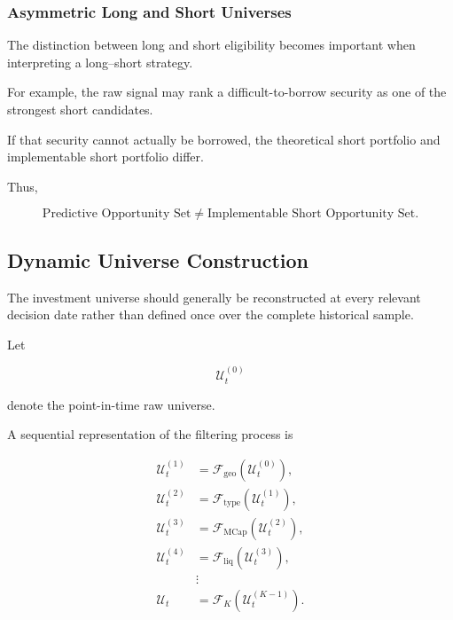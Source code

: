 \documentclass[11pt,a4paper]{article}
\begin{document}
\subsubsection{Asymmetric Long and Short Universes}

The distinction between long and short eligibility becomes important when
interpreting a long--short strategy.

For example, the raw signal may rank a difficult-to-borrow security as one of
the strongest short candidates.

If that security cannot actually be borrowed, the theoretical short portfolio
and implementable short portfolio differ.

Thus,

\begin{equation}
\boxed{
\text{Predictive Opportunity Set}
\neq
\text{Implementable Short Opportunity Set}.
}
\end{equation}


\subsection{Dynamic Universe Construction}
\label{subsec:dynamic_universe_construction}

The investment universe should generally be reconstructed at every relevant
decision date rather than defined once over the complete historical sample.

Let

\begin{equation}
\mathcal{U}_t^{(0)}
\end{equation}

denote the point-in-time raw universe.

A sequential representation of the filtering process is

\begin{equation}
\begin{aligned}
\mathcal{U}_t^{(1)}
&=
\mathcal{F}_{\mathrm{geo}}
\left(
\mathcal{U}_t^{(0)}
\right),
\\
\mathcal{U}_t^{(2)}
&=
\mathcal{F}_{\mathrm{type}}
\left(
\mathcal{U}_t^{(1)}
\right),
\\
\mathcal{U}_t^{(3)}
&=
\mathcal{F}_{\mathrm{MCap}}
\left(
\mathcal{U}_t^{(2)}
\right),
\\
\mathcal{U}_t^{(4)}
&=
\mathcal{F}_{\mathrm{liq}}
\left(
\mathcal{U}_t^{(3)}
\right),
\\
&\vdots
\\
\mathcal{U}_t
&=
\mathcal{F}_{K}
\left(
\mathcal{U}_t^{(K-1)}
\right).
\end{aligned}
\end{equation}
\end{document}
